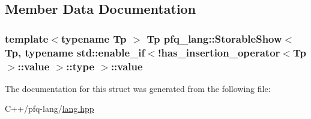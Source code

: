 \subsection{Member Data Documentation}
\hypertarget{structpfq__lang_1_1StorableShow_3_01Tp_00_01typename_01std_1_1enable__if_3_9has__insertion__operc98e9de6b381c730d9d28da7df10d016_a98fec55c620c3c3d998c2b75fc63fa23}{
\subsubsection[{value}]{\setlength{\rightskip}{0pt plus 5cm}template$<$typename Tp $>$ Tp {\bf pfq\+\_\+lang\+::\+Storable\+Show}$<$ Tp, typename std\+::enable\+\_\+if$<$!{\bf has\+\_\+insertion\+\_\+operator}$<$Tp $>$\+::value $>$\+::type $>$\+::value}}\label{structpfq__lang_1_1StorableShow_3_01Tp_00_01typename_01std_1_1enable__if_3_9has__insertion__operc98e9de6b381c730d9d28da7df10d016_a98fec55c620c3c3d998c2b75fc63fa23}


The documentation for this struct was generated from the following file\+:\begin{DoxyCompactItemize}
\item 
C++/pfq-\/lang/\hyperlink{lang_8hpp}{lang.\+hpp}\end{DoxyCompactItemize}
